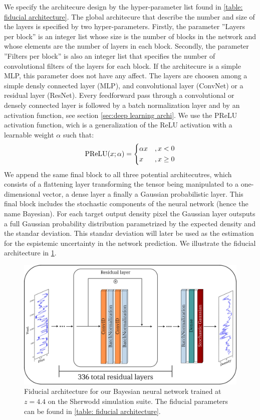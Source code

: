 We specify the architecure design by the hyper-parameter list found in \cref{table: fiducial architecture}. The global architecure that describe the number and size of the layers is specified by two hyper-parameters. Firstly, the parameter ''Layers per block'' is an integer list whose size is the number of blocks in the network and whose elements are the number of layers in each block. Secondly, the parameter ''Filters per block'' is also an integer list that specifies the number of convolutional filters of the layers for each block. If the architecure is a simple MLP, this parameter does not have any affect. The layers are choosen among a simple densly connected layer (MLP), and convolutional layer (ConvNet) or a residual layer (ResNet). Every feedforward pass through a convolutional or densely connected layer is followed by a batch normalization layer and by an activation function, see section \ref{sec:deep learning archi}. We use the PReLU activation function, wich is a generalization of the ReLU activation with a learnable weight $\alpha$ such that:
\begin{equation}
    \text{PReLU}(x;\alpha)=
    \begin{dcases}
        \alpha x &  , x<0\\
        x & , x\geq 0
    \end{dcases}
\end{equation}
We append the same final block to all three potential architecutres, which consists of a flattening layer transforming the tensor being manipulated to a one-dimensional vector, a dense layer a finally a Gaussian probabilistic layer.
This final block includes the stochastic components of the neural network (hence the name Bayesian). For each target output density pixel the Gaussian layer outsputs a full Gaussian probability distribution parametrized by the expected density and the standar deviation. This standar deviation will later be used as the estimation for the espistemic uncertainty in the network prediction. We illustrate the fiducial architecture in \cref{fig:ML nn architecture}.
\begin{figure}
    \centering
    \includegraphics[width=1\linewidth]{img/ML/nn_archi.jpg}
    \caption{Fiducial architecture for our Bayesian neural network trained at $z=4.4$ on the Sherwodd simulation suite. The fiducial parameters can be found in \cref{table: fiducial architecture}.}
    \label{fig:ML nn architecture}
\end{figure}

